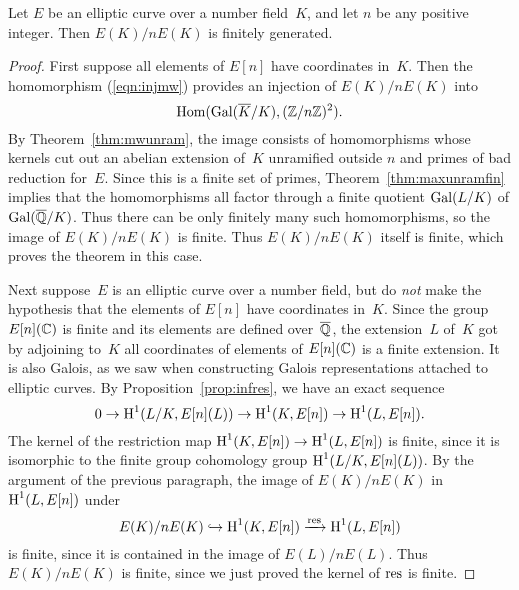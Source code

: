 \begin{theorem}
	Let $E$ be an elliptic curve over a number field~$K$, and
	let $n$ be any positive integer.  Then
	$E(K)/nE(K)$ is finitely generated.
\end{theorem}
\begin{proof}
	First suppose all elements of $E[n]$ have coordinates in~$K$.  Then
	the homomorphism (\ref{eqn:injmw}) provides an injection of $E(K)/n
	E(K)$ into
	$$
		\operatorname{Hom}(\operatorname{Gal}(\overline{K}/K), (\mathbb{Z}/n\mathbb{Z})^2).
	$$
	By Theorem~\ref{thm:mwunram}, the image consists of homomorphisms whose
	kernels cut out an abelian extension of~$K$ unramified outside $n$
	and primes of bad reduction for~$E$.  Since this is a finite set of
	primes, Theorem~\ref{thm:maxunramfin} implies that the homomorphisms
	all factor through a finite quotient $\operatorname{Gal}(L/K)$ of $\operatorname{Gal}(\overline{\mathbb{Q}}/K)$.
	Thus there can be only finitely many such homomorphisms, so the
	image of $E(K)/nE(K)$ is finite.  Thus $E(K)/nE(K)$ itself is
	finite, which proves the theorem in this case.
	
	Next suppose~$E$ is an elliptic curve over a number field, but do {\em
	not} make the hypothesis that the elements of $E[n]$ have
	coordinates in~$K$.  Since the group $E[n](\mathbb{C})$ is finite and its
	elements are defined over~$\overline{\mathbb{Q}}$, the extension~$L$ of~$K$ got by
	adjoining to~$K$ all coordinates of elements of $E[n](\mathbb{C})$ is a finite
	extension.  It is also Galois, as we saw when constructing Galois
	representations attached to elliptic curves.
	By Proposition~\ref{prop:infres}, we have an exact sequence
	$$
		0 \to \operatorname{H}^1(L/K, E[n](L))\to   \operatorname{H}^1(K,E[n])\to \operatorname{H}^1(L,E[n]).
	$$
	The kernel of the restriction map
	$\operatorname{H}^1(K,E[n])\to \operatorname{H}^1(L,E[n])$ is finite, since it is
	isomorphic to the finite group cohomology group
	$\operatorname{H}^1(L/K, E[n](L))$.  By the argument of the previous
	paragraph, the image of $E(K)/nE(K)$ in $\operatorname{H}^1(L,E[n])$
	under
	$$
		E(K)/n E(K) \hookrightarrow \operatorname{H}^1(K,E[n]) \xrightarrow{\operatorname{res}} \operatorname{H}^1(L,E[n])
	$$
	is finite, since it is contained in the image of $E(L)/n E(L)$.
	Thus $E(K)/n E(K)$ is finite, since we just proved
	the kernel of $\operatorname{res}$ is finite.
\end{proof}



